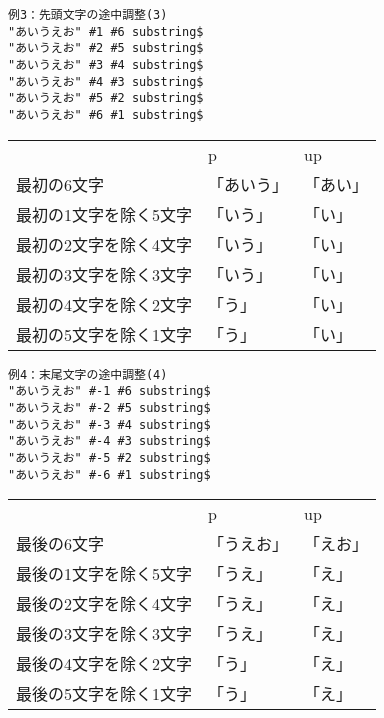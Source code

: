 \documentclass[a4paper,11pt,nomag,dvipdfmx]{jsarticle}
\def\pBibTeX{p\kern-.05em\BibTeX}
\def\upBibTeX{u\pBibTeX}
\def\pBibTeX{p\BibTeX}%
\def\upBibTeX{u\pBibTeX}%
\begin{document}
\par\medskip\noindent
\begin{minipage}{0.45\textwidth}
\begin{verbatim}
例3：先頭文字の途中調整(3)
"あいうえお" #1 #6 substring$
"あいうえお" #2 #5 substring$
"あいうえお" #3 #4 substring$
"あいうえお" #4 #3 substring$
"あいうえお" #5 #2 substring$
"あいうえお" #6 #1 substring$
\end{verbatim}
\end{minipage}
\begin{minipage}{0.5\textwidth}
\begin{tabular}{lll}
                       & \pBibTeX   & \upBibTeX \\
最初の6文字            & 「あいう」 & 「あい」  \\
最初の1文字を除く5文字 & 「いう」   & 「い」    \\
最初の2文字を除く4文字 & 「いう」   & 「い」    \\
最初の3文字を除く3文字 & 「いう」   & 「い」    \\
最初の4文字を除く2文字 & 「う」     & 「い」    \\
最初の5文字を除く1文字 & 「う」     & 「い」
\end{tabular}
\end{minipage}

\par\medskip\noindent
\begin{minipage}{0.45\textwidth}
\begin{verbatim}
例4：末尾文字の途中調整(4)
"あいうえお" #-1 #6 substring$
"あいうえお" #-2 #5 substring$
"あいうえお" #-3 #4 substring$
"あいうえお" #-4 #3 substring$
"あいうえお" #-5 #2 substring$
"あいうえお" #-6 #1 substring$
\end{verbatim}
\end{minipage}
\begin{minipage}{0.5\textwidth}
\begin{tabular}{lll}
                       & \pBibTeX   & \upBibTeX \\
最後の6文字            & 「うえお」 & 「えお」  \\
最後の1文字を除く5文字 & 「うえ」   & 「え」    \\
最後の2文字を除く4文字 & 「うえ」   & 「え」    \\
最後の3文字を除く3文字 & 「うえ」   & 「え」    \\
最後の4文字を除く2文字 & 「う」     & 「え」    \\
最後の5文字を除く1文字 & 「う」     & 「え」
\end{tabular}
\end{minipage}
\end{document}

